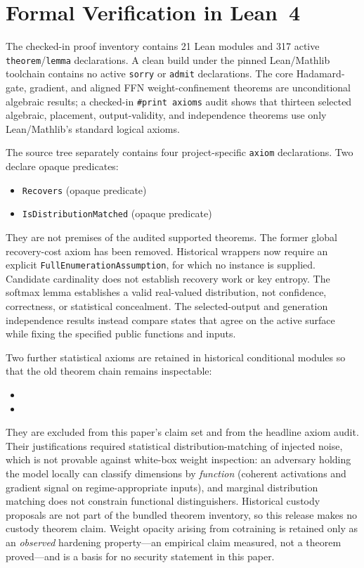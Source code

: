 \documentclass[11pt,a4paper]{article}
\begin{document}
\section{Formal Verification in Lean~4}
\label{sec:formal}

The checked-in proof inventory contains 21 Lean modules and 317 active
\texttt{theorem}/\texttt{lemma} declarations.  A clean build under
the pinned Lean/Mathlib toolchain contains no active \texttt{sorry}
or \texttt{admit} declarations.  The core Hadamard-gate, gradient,
and aligned FFN weight-confinement theorems are unconditional
algebraic results; a checked-in \texttt{\#print axioms} audit shows
that thirteen selected algebraic, placement, output-validity, and
independence theorems use only
Lean/Mathlib's standard logical axioms.

The source tree separately contains four project-specific
\texttt{axiom} declarations. Two declare opaque predicates:
\begin{itemize}[nosep]
    \item \texttt{Recovers} (opaque predicate)
    \item \texttt{IsDistributionMatched} (opaque predicate)
\end{itemize}
They are not premises of the audited supported theorems. The former global
recovery-cost axiom has been removed. Historical wrappers now require an explicit
\texttt{FullEnumerationAssumption}, for which no instance is supplied.
Candidate cardinality does not establish recovery work or key
entropy. The softmax lemma establishes a valid real-valued distribution, not
confidence, correctness, or statistical concealment. The selected-output and
generation independence results instead compare states that agree on the
active surface while fixing the specified public functions and inputs.

Two further statistical axioms are retained in historical
conditional modules so that the old theorem chain remains
inspectable:
\begin{itemize}[nosep]
    \item {}
    \item {}
\end{itemize}
They are excluded from this paper's claim set and from the headline
axiom audit. Their justifications required
statistical distribution-matching of injected noise, which is not
provable against white-box weight inspection: an adversary holding
the model locally can classify dimensions by \emph{function} (coherent
activations and gradient signal on regime-appropriate inputs), and
marginal distribution matching does not constrain functional
distinguishers. Historical custody proposals are not part of the bundled
theorem inventory, so this release makes no custody theorem claim. Weight
opacity arising from cotraining is retained only as an \emph{observed}
hardening property---an empirical claim measured, not a theorem proved---and
is a basis for no security statement in this paper.
\end{document}
